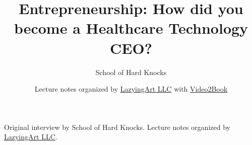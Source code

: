 \documentclass[11pt,oneside]{book}
\begin{document}
\frontmatter
\title{Entrepreneurship: How did you become a Healthcare Technology CEO?}
\author{School of Hard Knocks}
\date{Lecture notes organized by \href{https://lazying.art}{LazyingArt LLC} with \href{https://github.com/lachlanchen/Video2Book}{Video2Book}}
\maketitle
\begin{center}
\small Original interview by School of Hard Knocks. Lecture notes organized by \href{https://lazying.art}{LazyingArt LLC}.
\end{center}
\clearpage
\mainmatter

\end{document}
